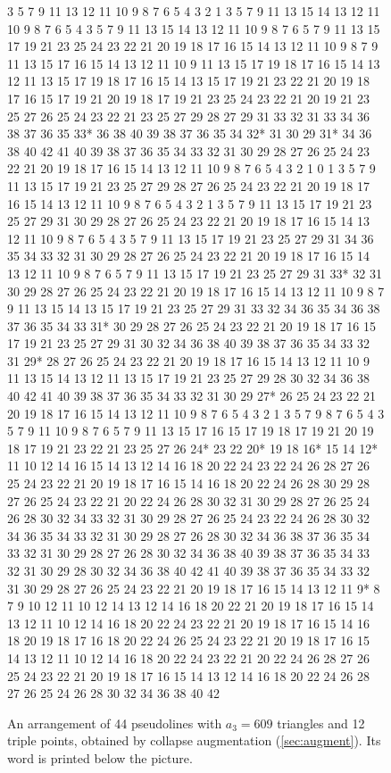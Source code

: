 \begin{figure}[p]
\noindent\resizebox{\linewidth}{!}{}

\smallskip
{\noindent\fontsize{5}{5.5}\selectfont{} 3 5 7 9 11 13 12 11 10 9 8 7 6 5 4 3 2 1 3 5 7 9 11 13 15 14 13 12 11 10 9 8 7 6 5 4 3 5 7 9 11 13 15 14 13 12 11 10 9 8 7 6 5 7 9 11 13 15 17 19 21 23 25 24 23 22 21 20 19 18 17 16 15 14 13 12 11 10 9 8 7 9 11 13 15 17 16 15 14 13 12 11 10 9 11 13 15 17 19 18 17 16 15 14 13 12 11 13 15 17 19 18 17 16 15 14 13 15 17 19 21 23 22 21 20 19 18 17 16 15 17 19 21 20 19 18 17 19 21 23 25 24 23 22 21 20 19 21 23 25 27 26 25 24 23 22 21 23 25 27 29 28 27 29 31 33 32 31 33 34 36 38 37 36 35 33* 36 38 40 39 38 37 36 35 34 32* 31 30 29 31* 34 36 38 40 42 41 40 39 38 37 36 35 34 33 32 31 30 29 28 27 26 25 24 23 22 21 20 19 18 17 16 15 14 13 12 11 10 9 8 7 6 5 4 3 2 1 0 1 3 5 7 9 11 13 15 17 19 21 23 25 27 29 28 27 26 25 24 23 22 21 20 19 18 17 16 15 14 13 12 11 10 9 8 7 6 5 4 3 2 1 3 5 7 9 11 13 15 17 19 21 23 25 27 29 31 30 29 28 27 26 25 24 23 22 21 20 19 18 17 16 15 14 13 12 11 10 9 8 7 6 5 4 3 5 7 9 11 13 15 17 19 21 23 25 27 29 31 34 36 35 34 33 32 31 30 29 28 27 26 25 24 23 22 21 20 19 18 17 16 15 14 13 12 11 10 9 8 7 6 5 7 9 11 13 15 17 19 21 23 25 27 29 31 33* 32 31 30 29 28 27 26 25 24 23 22 21 20 19 18 17 16 15 14 13 12 11 10 9 8 7 9 11 13 15 14 13 15 17 19 21 23 25 27 29 31 33 32 34 36 35 34 36 38 37 36 35 34 33 31* 30 29 28 27 26 25 24 23 22 21 20 19 18 17 16 15 17 19 21 23 25 27 29 31 30 32 34 36 38 40 39 38 37 36 35 34 33 32 31 29* 28 27 26 25 24 23 22 21 20 19 18 17 16 15 14 13 12 11 10 9 11 13 15 14 13 12 11 13 15 17 19 21 23 25 27 29 28 30 32 34 36 38 40 42 41 40 39 38 37 36 35 34 33 32 31 30 29 27* 26 25 24 23 22 21 20 19 18 17 16 15 14 13 12 11 10 9 8 7 6 5 4 3 2 1 3 5 7 9 8 7 6 5 4 3 5 7 9 11 10 9 8 7 6 5 7 9 11 13 15 17 16 15 17 19 18 17 19 21 20 19 18 17 19 21 23 22 21 23 25 27 26 24* 23 22 20* 19 18 16* 15 14 12* 11 10 12 14 16 15 14 13 12 14 16 18 20 22 24 23 22 24 26 28 27 26 25 24 23 22 21 20 19 18 17 16 15 14 16 18 20 22 24 26 28 30 29 28 27 26 25 24 23 22 21 20 22 24 26 28 30 32 31 30 29 28 27 26 25 24 26 28 30 32 34 33 32 31 30 29 28 27 26 25 24 23 22 24 26 28 30 32 34 36 35 34 33 32 31 30 29 28 27 26 28 30 32 34 36 38 37 36 35 34 33 32 31 30 29 28 27 26 28 30 32 34 36 38 40 39 38 37 36 35 34 33 32 31 30 29 28 30 32 34 36 38 40 42 41 40 39 38 37 36 35 34 33 32 31 30 29 28 27 26 25 24 23 22 21 20 19 18 17 16 15 14 13 12 11 9* 8 7 9 10 12 11 10 12 14 13 12 14 16 18 20 22 21 20 19 18 17 16 15 14 13 12 11 10 12 14 16 18 20 22 24 23 22 21 20 19 18 17 16 15 14 16 18 20 19 18 17 16 18 20 22 24 26 25 24 23 22 21 20 19 18 17 16 15 14 13 12 11 10 12 14 16 18 20 22 24 23 22 21 20 22 24 26 28 27 26 25 24 23 22 21 20 19 18 17 16 15 14 13 12 14 16 18 20 22 24 26 28 27 26 25 24 26 28 30 32 34 36 38 40 42\par}
\caption{An arrangement of 44 pseudolines with $a_3=609$ triangles and 12 triple points, obtained by collapse augmentation (\cref{sec:augment}). Its word is printed below the picture.}
\label{fig:n44}
\end{figure}

\clearpage
